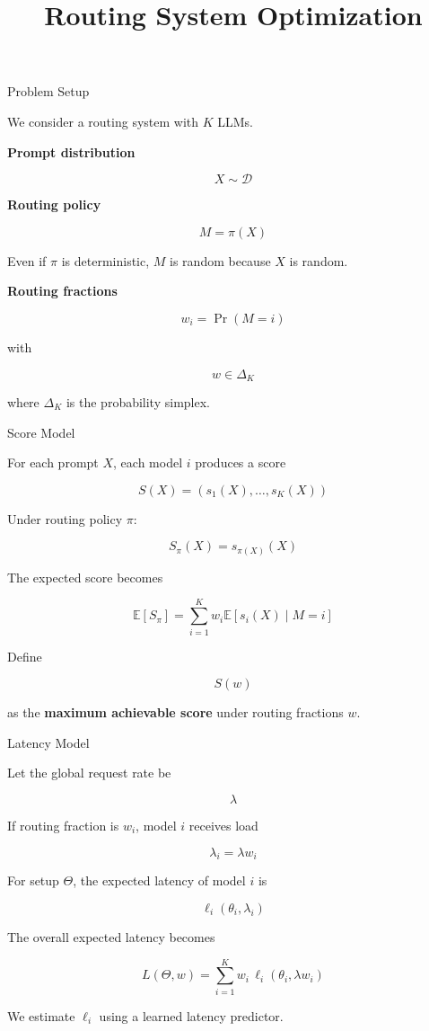 \documentclass{beamer}
\title{Routing System Optimization}
\author{}
\date{}
\begin{document}
\frame{\titlepage}

\begin{frame}{Problem Setup}

We consider a routing system with $K$ LLMs.

\textbf{Prompt distribution}

\[
X \sim \mathcal{D}
\]

\textbf{Routing policy}

\[
M = \pi(X)
\]

Even if $\pi$ is deterministic, $M$ is random because $X$ is random.

\textbf{Routing fractions}

\[
w_i = \Pr(M=i)
\]

with

\[
w \in \Delta_K
\]

where $\Delta_K$ is the probability simplex.

\end{frame}

\begin{frame}{Score Model}

For each prompt $X$, each model $i$ produces a score

\[
S(X) = (s_1(X), \dots, s_K(X))
\]

Under routing policy $\pi$:

\[
S_\pi(X) = s_{\pi(X)}(X)
\]

The expected score becomes

\[
\mathbb{E}[S_\pi]
=
\sum_{i=1}^K
w_i
\mathbb{E}[s_i(X) \mid M=i]
\]

Define

\[
S(w)
\]

as the \textbf{maximum achievable score} under routing fractions $w$.

\end{frame}

\begin{frame}{Latency Model}

Let the global request rate be

\[
\lambda
\]

If routing fraction is $w_i$, model $i$ receives load

\[
\lambda_i = \lambda w_i
\]

For setup $\Theta$, the expected latency of model $i$ is

\[
\ell_i(\theta_i, \lambda_i)
\]

The overall expected latency becomes

\[
L(\Theta, w)
=
\sum_{i=1}^{K}
w_i
\,
\ell_i(\theta_i, \lambda w_i)
\]

We estimate $\ell_i$ using a learned latency predictor.

\end{frame}
\end{document}
